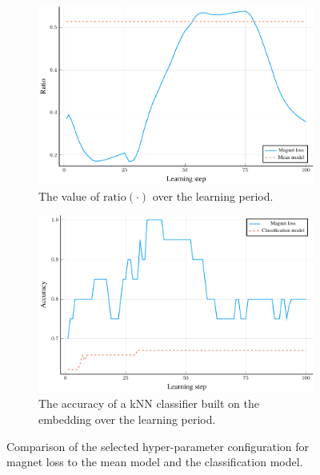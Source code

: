 \begin{figure}[h]
  \centering
  \begin{subfigure}[b]{0.49\textwidth}
    \centering
    \includegraphics[width=\textwidth]{images/magnet-baseline/ratio/magnet-baseline-ratio.pdf}
    \caption{The value of \( \mathrm{ratio} \left( \cdot \right) \) over the learning period.}
  \end{subfigure}
  \hfill
  \begin{subfigure}[b]{0.49\textwidth}
    \centering
    \includegraphics[width=\textwidth]{images/magnet-baseline/accuracy/magnet-baseline-accuracy.pdf}
    \caption{The accuracy of a kNN classifier built on the embedding over the learning period.}
  \end{subfigure}
  \caption{Comparison of the selected hyper-parameter configuration for magnet loss to the mean model and the classification model.}\label{fig:magnet-baseline}
\end{figure}

